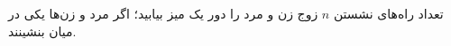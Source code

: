 \p
تعداد راه‌های نشستن $n$ 
زوج زن و مرد را دور یک میز بیابید؛ اگر
مرد و زن‌ها یکی در میان بنشینند.

